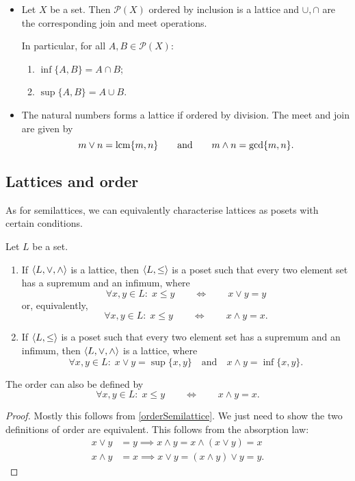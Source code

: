 \begin{example}
\begin{itemize}
\item Let $X$ be a set. Then $\mathcal{P}(X)$ ordered by inclusion is a lattice and $\cup, \cap$ are the corresponding join and meet operations.

In particular, for all $A,B\in \mathcal{P}(X)$:
\begin{enumerate}
\item $\inf\{A,B\} = A\cap B$;
\item $\sup\{A,B\} = A\cup B$.
\end{enumerate}
\item The natural numbers forms a lattice if ordered by division. The meet and join are given by
\[ m\vee n = \operatorname{lcm}\{m,n\} \qquad \text{and}\qquad m\wedge n = \gcd\{m,n\}. \]
\end{itemize}
\end{example}

\subsection{Lattices and order}
As for semilattices, we can equivalently characterise lattices as posets with certain conditions.
\begin{proposition}
Let $L$ be a set.
\begin{enumerate}
\item If $\left\langle L,\vee, \wedge \right\rangle$ is a lattice, then $\left\langle L,\leq \right\rangle$ is a poset such that every two element set has a supremum and an infimum, where
\[ \forall x,y\in L:\; x\leq y \qquad \iff \qquad x\vee y = y \]
or, equivalently,
\[ \forall x,y\in L:\; x\leq y \qquad \iff \qquad x\wedge y = x. \]
\item If $\left\langle L,\leq \right\rangle$ is a poset such that every two element set has a supremum and an infimum, then $\left\langle L,\vee, \wedge \right\rangle$ is a lattice, where
\[ \forall x,y\in L: \; x\vee y = \sup\{x,y\} \quad \text{and} \quad x\wedge y = \inf\{x,y\}. \]
\end{enumerate}
The order can also be defined by
\[ \forall x,y\in L:\; x\leq y \qquad \iff \qquad x\wedge y = x. \]
\end{proposition}
\begin{proof}
Mostly this follows from \ref{orderSemilattice}. We just need to show the two definitions of order are equivalent. This follows from the absorption law:
\begin{align*}
x\vee y &= y \implies x\wedge y = x\wedge (x\vee y) = x \\
x\wedge y &= x \implies x\vee y = (x\wedge y) \vee y = y.
\end{align*}
\end{proof}

